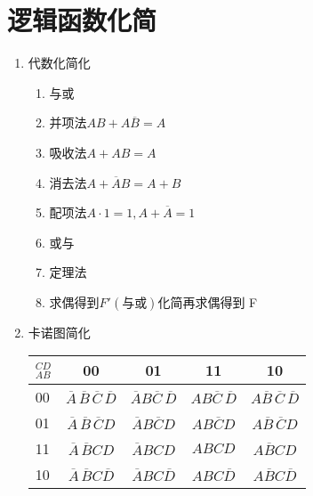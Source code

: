 \begin{enumerate}
\begin{enumerate}
\end{enumerate}

\newpage

\section{逻辑函数化简}

\begin{enumerate}

    \item 代数化简化

          \begin{enumerate}

              \item 与或
              \item 并项法$AB+A\overline{B}=A$
              \item 吸收法$A+AB=A$
              \item 消去法$A+\overline{A}B=A+B$
              \item 配项法$A\cdot{1}=1,A+\overline{A}=1$
              \item 或与
              \item 定理法
              \item 求偶得到$F'(与或)$化简再求偶得到 F

          \end{enumerate}


    \item 卡诺图简化


          \begin{table}[!htbp]
              \centering
              \begin{tabular}{l|c|c|c|c}
                  \toprule
                  $_{AB}^{CD}$ & 00                                                       & 01                                        & 11                             & 10                                          \\
                  \midrule
                  00           & $\overline{A}\,\overline{B}\,\overline{C}\,\overline{D}$ & $\overline{A}B\overline{C}\,\overline{D}$ & $AB\overline{C}\,\overline{D}$ & $A\overline{B}\,\overline{C}\,\overline{D}$ \\
                  01           & $\overline{A}\,\overline{B}\,\overline{C}D$              & $\overline{A}B\overline{C}D$              & $AB\overline{C}D$              & $A\overline{B}\,\overline{C}D$              \\
                  11           & $\overline{A}\,\overline{B}CD$                           & $\overline{A}BCD$                         & $ABCD$                         & $A\overline{B}CD$                           \\
                  10           & $\overline{A}\,\overline{B}C\overline{D}$                & $\overline{A}BC\overline{D}$              & $ABC\overline{D}$              & $A\overline{B}C\overline{D}$                \\
                  \bottomrule
              \end{tabular}
          \end{table}


\end{enumerate}
\end{enumerate}
